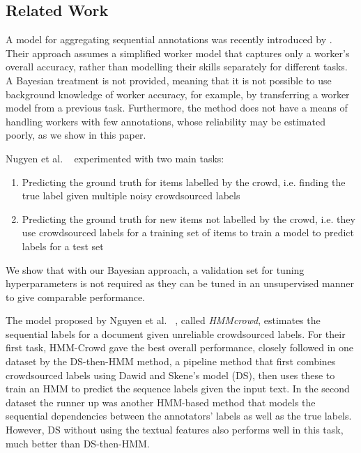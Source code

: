 \subsection{Related Work}

A model for aggregating sequential annotations was recently introduced by \cite{nguyen2017aggregating}. Their approach assumes a simplified worker model that captures only a worker's overall accuracy, rather than modelling their skills separately for different tasks. A Bayesian treatment is not provided, meaning that it is not possible to use background knowledge of worker accuracy, for example, by transferring a worker model from a previous task.
Furthermore, the method does not have a means of handling workers with few annotations, whose reliability may be estimated poorly, as we show in this paper. 

Nugyen et al. ~ experimented with two main tasks: 
\begin{enumerate}
\item Predicting the ground truth for items labelled by the crowd, i.e. finding the true label given multiple noisy crowdsourced labels
\item Predicting the ground truth for new items not labelled by the crowd, i.e. they use crowdsourced labels for a training set of items to train a model to predict labels for a test set
\end{enumerate}
We show that with our Bayesian approach, a validation set for tuning hyperparameters is not required as they can be tuned in an unsupervised manner to give comparable performance.

The model proposed by Nguyen et al. ~, called \emph{HMMcrowd}, 
estimates the sequential labels for a document given unreliable crowdsourced labels. 
For their first task, HMM-Crowd gave the best overall performance, closely followed in one dataset by 
the DS-then-HMM method, 
a pipeline method that first combines crowdsourced labels using Dawid and Skene's model (DS),
then uses these to train an HMM to predict the sequence labels given the input text.
In the second dataset the runner up was another HMM-based method that models the sequential dependencies between
the annotators' labels as well as the true labels. However, DS without using the textual features also performs well in
this task, much better than DS-then-HMM. 

